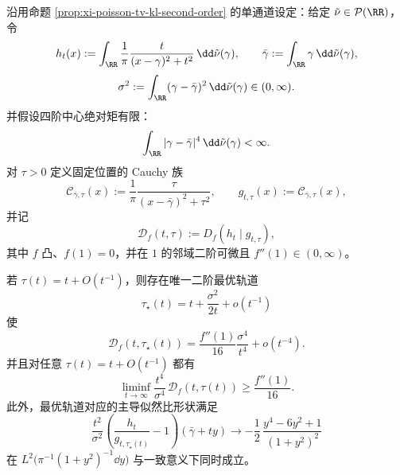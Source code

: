 \begin{theorem}\label{thm:xi-cauchy-poisson-fixed-location-scale-optimal-renormalization}
沿用命题 \ref{prop:xi-poisson-tv-kl-second-order} 的单通道设定：给定 \(\tilde\nu\in\mathcal P(\RR)\)，令
\[
h_t(x):=\int_{\RR}\frac1\pi\frac{t}{(x-\gamma)^2+t^2}\,\dd\tilde\nu(\gamma),\qquad
\bar\gamma:=\int_{\RR}\gamma\,\dd\tilde\nu(\gamma),
\]
\[
\sigma^2:=\int_{\RR}(\gamma-\bar\gamma)^2\,\dd\tilde\nu(\gamma)\in(0,\infty).
\]
并假设四阶中心绝对矩有限：
\[
\int_{\RR}|\gamma-\bar\gamma|^4\,\dd\tilde\nu(\gamma)<\infty.
\]
对 \(\tau>0\) 定义固定位置的 Cauchy 族
\[
\mathcal C_{\bar\gamma,\tau}(x):=\frac1\pi\frac{\tau}{(x-\bar\gamma)^2+\tau^2},
\qquad
g_{t,\tau}(x):=\mathcal C_{\bar\gamma,\tau}(x),
\]
并记
\[
\mathcal D_f(t,\tau):=D_f(h_t\mid g_{t,\tau}),
\]
其中 \(f\) 凸、\(f(1)=0\)，并在 \(1\) 的邻域二阶可微且 \(f''(1)\in(0,\infty)\)。

若 \(\tau(t)=t+O(t^{-1})\)，则存在唯一二阶最优轨道
\[
\tau_\star(t)=t+\frac{\sigma^2}{2t}+o(t^{-1})
\]
使
\[
\mathcal D_f(t,\tau_\star(t))
=\frac{f''(1)}{16}\frac{\sigma^4}{t^4}+o(t^{-4}).
\]
并且对任意 \(\tau(t)=t+O(t^{-1})\) 都有
\[
\liminf_{t\to\infty}\frac{t^4}{\sigma^4}\,\mathcal D_f(t,\tau(t))
\ge \frac{f''(1)}{16}.
\]
此外，最优轨道对应的主导似然比形状满足
\[
\frac{t^2}{\sigma^2}\left(\frac{h_t}{g_{t,\tau_\star(t)}}-1\right)(\bar\gamma+ty)
\longrightarrow
-\frac12\,\frac{y^4-6y^2+1}{(1+y^2)^2}
\]
在 \(L^2\!\bigl(\pi^{-1}(1+y^2)^{-1}\dd y\bigr)\) 与一致意义下同时成立。
\end{theorem}
